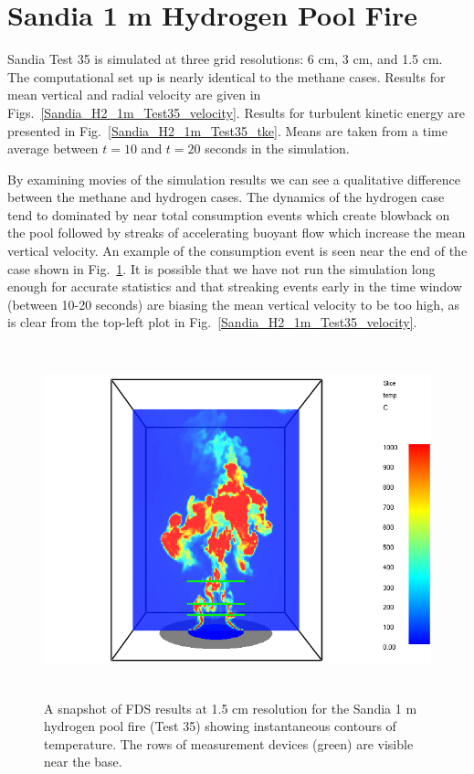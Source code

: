 \clearpage

\section{Sandia 1 m Hydrogen Pool Fire}
\label{Sandia_hydrogen}

Sandia Test 35 \cite{Tieszen:2004} is simulated at three grid resolutions: 6 cm, 3 cm, and 1.5 cm.  The computational set up is nearly identical to the methane cases.  Results for mean vertical and radial velocity are given in Figs.~\ref{Sandia_H2_1m_Test35_velocity}.  Results for turbulent kinetic energy are presented in Fig.~\ref{Sandia_H2_1m_Test35_tke}.  Means are taken from a time average between $t=10$ and $t=20$ seconds in the simulation.

By examining movies of the simulation results we can see a qualitative difference between the methane and hydrogen cases.  The dynamics of the hydrogen case tend to dominated by near total consumption events which create blowback on the pool followed by streaks of accelerating buoyant flow which increase the mean vertical velocity.  An example of the consumption event is seen near the end of the case shown in Fig.~\ref{Sandia_H2_1m_image}.  It is possible that we have not run the simulation long enough for accurate statistics and that streaking events early in the time window (between 10-20 seconds) are biasing the mean vertical velocity to be too high, as is clear from the top-left plot in Fig.~\ref{Sandia_H2_1m_Test35_velocity}.

\begin{figure}[h]
\begin{center}
\includegraphics[height=4in]{FIGURES/Sandia_Plumes/Sandia_H2_1m_image}
\caption[Sandia 1~m hydrogen pool fire instantaneous temperature contours.]{A snapshot of FDS results at 1.5 cm resolution for the Sandia 1 m hydrogen pool fire (Test 35) showing instantaneous contours of temperature.  The rows of measurement devices (green) are visible near the base.}
\label{Sandia_H2_1m_image}
\end{center}
\end{figure}

